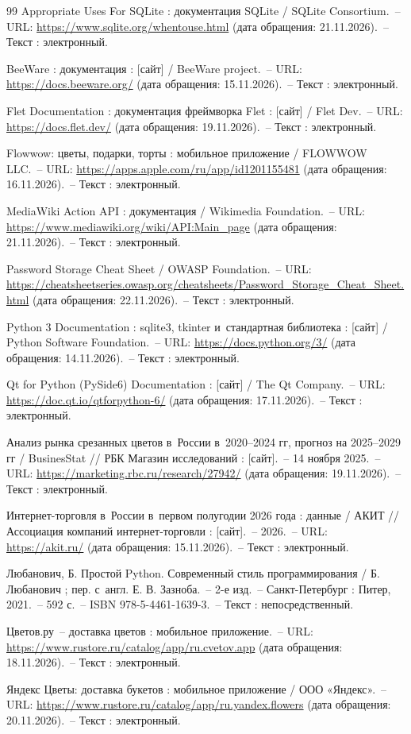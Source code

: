 \documentclass[14pt,a4paper]{extarticle}
\begin{document}
\clearpage
{}
\begingroup\raggedright\singlespacing
\begin{thebibliography}{99}
 Appropriate Uses For SQLite : документация SQLite / SQLite Consortium.~– URL: \url{https://www.sqlite.org/whentouse.html} (дата обращения: 21.11.2026).~– Текст : электронный.

 BeeWare : документация : [сайт] / BeeWare project.~– URL: \url{https://docs.beeware.org/} (дата обращения: 15.11.2026).~– Текст : электронный.

 Flet Documentation : документация фреймворка Flet : [сайт] / Flet Dev.~– URL: \url{https://docs.flet.dev/} (дата обращения: 19.11.2026).~– Текст : электронный.

 Flowwow: цветы, подарки, торты : мобильное приложение / FLOWWOW LLC.~– URL: \url{https://apps.apple.com/ru/app/id1201155481} (дата обращения: 16.11.2026).~– Текст : электронный.

 MediaWiki Action API : документация / Wikimedia Foundation.~– URL: \url{https://www.mediawiki.org/wiki/API:Main_page} (дата обращения: 21.11.2026).~– Текст : электронный.

 Password Storage Cheat Sheet / OWASP Foundation.~– URL: \url{https://cheatsheetseries.owasp.org/cheatsheets/Password_Storage_Cheat_Sheet.html} (дата обращения: 22.11.2026).~– Текст : электронный.

 Python 3 Documentation : sqlite3, tkinter и~стандартная библиотека : [сайт] / Python Software Foundation.~– URL: \url{https://docs.python.org/3/} (дата обращения: 14.11.2026).~– Текст : электронный.

 Qt for Python (PySide6) Documentation : [сайт] / The Qt Company.~– URL: \url{https://doc.qt.io/qtforpython-6/} (дата обращения: 17.11.2026).~– Текст : электронный.

 Анализ рынка срезанных цветов в~России в~2020–2024 гг, прогноз на 2025–2029 гг / BusinesStat // РБК Магазин исследований : [сайт].~– 14 ноября 2025.~– URL: \url{https://marketing.rbc.ru/research/27942/} (дата обращения: 19.11.2026).~– Текст : электронный.

 Интернет-торговля в~России в~первом полугодии 2026 года : данные / АКИТ // Ассоциация компаний интернет-торговли : [сайт].~– 2026.~– URL: \url{https://akit.ru/} (дата обращения: 15.11.2026).~– Текст : электронный.

 Любанович, Б. Простой Python. Современный стиль программирования / Б. Любанович ; пер. с~англ. Е. В. Зазноба.~– 2-е изд.~– Санкт-Петербург : Питер, 2021.~– 592 с.~– ISBN 978-5-4461-1639-3.~– Текст : непосредственный.

 Цветов.ру~– доставка цветов : мобильное приложение.~– URL: \url{https://www.rustore.ru/catalog/app/ru.cvetov.app} (дата обращения: 18.11.2026).~– Текст : электронный.

 Яндекс Цветы: доставка букетов : мобильное приложение / ООО «Яндекс».~– URL: \url{https://www.rustore.ru/catalog/app/ru.yandex.flowers} (дата обращения: 20.11.2026).~– Текст : электронный.
\end{thebibliography}
\endgroup
\end{document}
